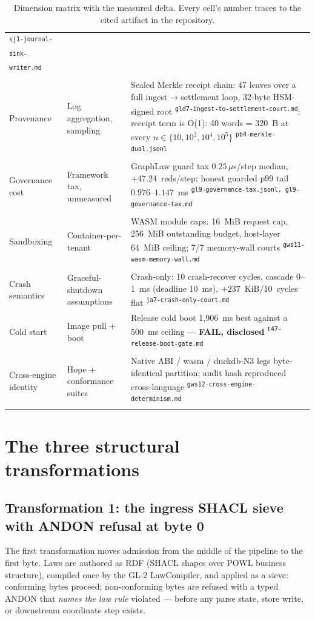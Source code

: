 \documentclass[11pt,a4paper]{article}
\newcommand{\art}[1]{\textsuperscript{\tiny\texttt{#1}}}
\begin{document}
\begin{table}[htbp]
{\begin{tabular}{@{}p{3.1cm}p{4.2cm}p{7.0cm}@{}}
\art{sj1-journal-sink-writer.md} \\
\addlinespace
Provenance & Log aggregation, sampling &
Sealed Merkle receipt chain: 47 leaves over a full ingest$\to$settlement loop,
32-byte HSM-signed root \art{gld7-ingest-to-settlement-court.md}; receipt term is O(1):
40 words = 320~B at every $n\in\{10,10^2,10^4,10^5\}$
\art{pb4-merkle-dual.jsonl} \\
\addlinespace
Governance cost & Framework tax, unmeasured &
GraphLaw guard tax $0.25\,\mu$s/step median, $+47.24$~reds/step; honest guarded p99 tail
$0.976$--$1.147$~ms \art{gl9-governance-tax.jsonl, gl9-governance-tax.md} \\
\addlinespace
Sandboxing & Container-per-tenant &
WASM module caps: 16~MiB request cap, 256~MiB outstanding budget, host-layer 64~MiB
ceiling; 7/7 memory-wall courts \art{gws11-wasm-memory-wall.md} \\
\addlinespace
Crash semantics & Graceful-shutdown assumptions &
Crash-only: 10 crash-recover cycles, cascade 0--1~ms (deadline 10~ms), $+237$~KiB/10~cycles
flat \art{ja7-crash-only-court.md} \\
\addlinespace
Cold start & Image pull + boot &
Release cold boot 1{,}906~ms best against a 500~ms ceiling --- \textbf{FAIL, disclosed}
\art{t47-release-boot-gate.md} \\
\addlinespace
Cross-engine identity & Hope + conformance suites &
Native ABI / wasm / duckdb-N3 legs byte-identical partition; audit hash reproduced
cross-language \art{gws12-cross-engine-determinism.md} \\
\bottomrule
\end{tabular}}
\caption{Dimension matrix with the measured delta. Every cell's number traces to the cited
artifact in the repository.}
\label{tab:matrix}
\end{table}

\section{The three structural transformations}

\subsection{Transformation 1: the ingress SHACL sieve with ANDON refusal at byte 0}

The first transformation moves admission from the middle of the pipeline to the first byte.
Laws are authored as RDF (SHACL shapes over POWL business structure), compiled once by the
GL-2 LawCompiler, and applied as a sieve: conforming bytes proceed; non-conforming bytes are
refused with a typed ANDON that \emph{names the law rule} violated --- before any parse
state, store write, or downstream coordinate step exists.
\end{document}
